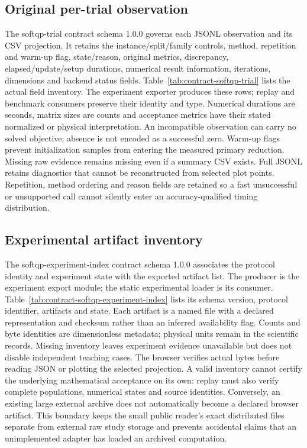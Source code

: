 \subsection{Original per-trial observation}\label{sec:contract-softqp-trial}
The softqp-trial contract schema 1.0.0 governs each JSONL observation and its
CSV projection. It retains the instance/split/family controls, method,
repetition and warm-up flag, state/reason, original metrics, discrepancy,
elapsed/update/setup durations, numerical result information, iterations,
dimensions and backend status fields. Table~\ref{tab:contract-softqp-trial}
lists the actual field inventory. The experiment exporter produces these
rows; replay and benchmark consumers preserve their identity and type.
Numerical durations are seconds, matrix sizes are counts and acceptance
metrics have their stated normalized or physical interpretation. An
incompatible observation can carry no solved objective; absence is not
encoded as a successful zero. Warm-up flags prevent initialization samples
from entering the measured primary reduction. Missing raw evidence remains
missing even if a summary CSV exists. Full JSONL retains diagnostics that
cannot be reconstructed from selected plot points. Repetition, method
ordering and reason fields are retained so a fast unsuccessful or unsupported
call cannot silently enter an accuracy-qualified timing distribution.


\subsection{Experimental artifact inventory}\label{sec:contract-softqp-experiment-index}
The softqp-experiment-index contract schema 1.0.0 associates the protocol
identity and experiment state with the exported artifact list. The producer
is the experiment export module; the static experimental loader is its
consumer. Table~\ref{tab:contract-softqp-experiment-index} lists its schema
version, protocol identifier, artifacts and state. Each artifact is a named
file with a declared representation and checksum rather than an inferred
availability flag. Counts and byte identities are dimensionless metadata;
physical units remain in the scientific records. Missing inventory leaves
experiment evidence unavailable but does not disable independent teaching
cases. The browser verifies actual bytes before reading JSON or plotting
the selected projection. A valid inventory cannot certify the underlying
mathematical acceptance on its own: replay must also verify complete
populations, numerical states and source identities. Conversely, an existing
large external archive does not automatically become a declared browser
artifact. This boundary keeps the small public reader's exact distributed
files separate from external raw study storage and prevents accidental
claims that an unimplemented adapter has loaded an archived computation.


